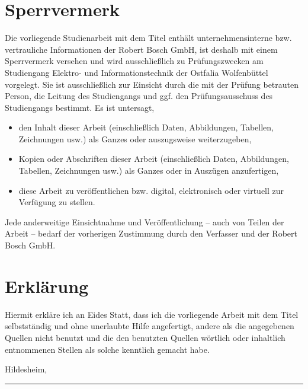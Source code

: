\section*{Sperrvermerk}\thispagestyle{empty}
Die vorliegende Studienarbeit mit dem Titel \textit{\myTitle} enthält unternehmensinterne bzw. vertrauliche Informationen der Robert Bosch GmbH, ist deshalb mit einem Sperrvermerk versehen und wird ausschließlich zu Prüfungszwecken am Studiengang Elektro- und Informationstechnik der Ostfalia Wolfenbüttel vorgelegt. Sie ist ausschließlich zur Einsicht durch die mit der Prüfung betrauten Person, die Leitung des Studiengangs und ggf. den Prüfungsausschuss des Studiengangs bestimmt. Es ist untersagt,
\begin{itemize}
	\item den Inhalt dieser Arbeit (einschließlich Daten, Abbildungen, Tabellen, Zeichnungen usw.) als Ganzes oder auszugsweise weiterzugeben,
	\item Kopien oder Abschriften dieser Arbeit (einschließlich Daten, Abbildungen, Tabellen, Zeichnungen usw.) als Ganzes oder in Auszügen anzufertigen,
	\item diese Arbeit zu veröffentlichen bzw. digital, elektronisch oder virtuell zur Verfügung zu stellen. 
\end{itemize}
Jede anderweitige Einsichtnahme und Veröffentlichung – auch von Teilen der Arbeit – bedarf der vorherigen Zustimmung durch den Verfasser und der Robert Bosch GmbH.

\clearpage

\section*{Erklärung}\thispagestyle{empty}
Hiermit erkläre ich an Eides Statt, dass ich die vorliegende Arbeit mit dem Titel \textit{\myTitle} selbstständig und  ohne  unerlaubte  Hilfe  angefertigt,  andere  als  die  angegebenen  Quellen  nicht benutzt und die den benutzten Quellen wörtlich oder inhaltlich entnommenen Stellen als solche kenntlich gemacht habe.

\vspace{3em}

Hildesheim, \myDate
\vspace{4em}

\rule{6cm}{0.4pt}\\
\myAuthorA


\clearpage

